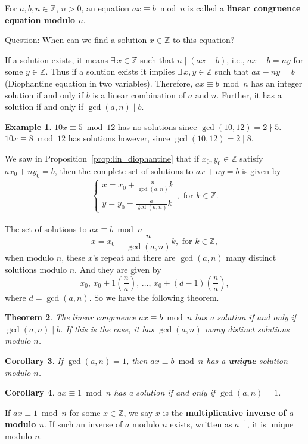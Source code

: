 \documentclass{amsbook}
\theoremstyle{plain}
\newtheorem{theorem}{Theorem}[chapter] %
\newtheorem{corollary}[theorem]{Corollary}
\theoremstyle{definition}
\newtheorem{example}[theorem]{Example}
\theoremstyle{remark}
\numberwithin{equation}{chapter}
\numberwithin{figure}{chapter}
\newcommand{\Z}{\mathbb{Z}}
\begin{document}
For $a, b, n \in \Z$, $n > 0$, an equation $ax \equiv b \bmod n$ is called a \textbf{linear congruence equation modulo $n$}.

Q\underline{uestion}: When can we find a solution $x \in \Z$ to this equation?

If a solution exists, it means $\exists \, x \in \Z$ such that $n \mid (ax - b)$, i.e., $ax - b = ny$ for some $y \in \Z$. Thus if a solution exists it implies $\exists \, x, y \in \Z$ such that $ax - ny = b$ (Diophantine equation in two variables). Therefore, $ax \equiv b \bmod n$ has an integer solution if and only if $b$ is a linear combination of $a$ and $n$. Further, it has a solution if and only if $\gcd (a, n) \mid b$.

\begin{example}
$10x \equiv 5 \bmod 12$ has no solutions since $\gcd (10, 12) = 2 \nmid 5$. $10x \equiv 8 \bmod 12$ has solutions however, since $\gcd (10, 12) = 2 \mid 8$.
\end{example}

We saw in Proposition~\ref{prop:lin_diophantine} that if $x_0, y_0 \in \Z$ satisfy $a x_0 +  n y_0 = b$, then the complete set of solutions to $ax + ny = b$ is given by
\begin{align}
\left\{ \begin{array}{l}
         x = x_0 + \displaystyle \frac{n}{\gcd (a, n)}k \\
          \\
         y = y_0 - \displaystyle \frac{a}{\gcd (a, n)}k 
        \end{array} , \text{ for } k \in \Z \right. .
\end{align}

The set of solutions to $ax \equiv b \bmod n$ 
\[
         x = x_0 + \displaystyle \frac{n}{\gcd (a, n)}k, \text{ for } k \in \Z,
\]
when modulo $n$, these $x$'s repeat and there are $\gcd (a, n)$ many distinct solutions modulo $n$. And they are given by
\[
x_0, \, x_0 + 1\left( \frac{n}a \right), \, \ldots, \, x_0 + (d-1)\left( \frac{n}a \right), 
\]
where $d = \gcd(a, n)$. So we have the following theorem.

\begin{theorem}\label{thm:num_soln_lin_cong}
The linear congruence $ax \equiv b \bmod n$ has a solution if and only if $\gcd (a, n) \mid b$. If this is the case, it has $\gcd (a, n)$ many distinct solutions modulo $n$.
\end{theorem}

\begin{corollary}\label{cor:lin_cong_soln}
If $\gcd (a, n) = 1$, then $ax \equiv b \bmod n$ has a \textbf{unique} solution modulo $n$.
\end{corollary}
\begin{corollary}
$ax \equiv 1 \bmod n$ has a solution if and only if $\gcd (a, n) = 1$.
\end{corollary}
If $ax \equiv 1 \bmod n$ for some $x \in \Z$, we say $x$ is the \textbf{multiplicative inverse of $a$ modulo $n$}. If such an inverse of $a$ modulo $n$ exists, written as $a^{-1}$, it is unique modulo $n$.
\end{document}
